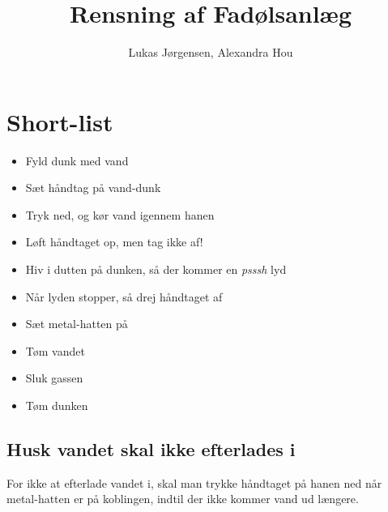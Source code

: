 

\title{Rensning af Fadølsanlæg}
\date{}
\author{Lukas Jørgensen, Alexandra Hou}



\maketitle

\section{Short-list}

\begin{itemize}
  \item Fyld dunk med vand
  \item Sæt håndtag på vand-dunk
  \item Tryk ned, og kør vand igennem hanen
  \item Løft håndtaget op, men tag ikke af!
  \item Hiv i dutten på dunken, så der kommer en \textit{psssh} lyd
  \item Når lyden stopper, så drej håndtaget af
  \item Sæt metal-hatten på
  \item Tøm vandet
  \item Sluk gassen
  \item Tøm dunken
\end{itemize}

\subsection{Husk vandet skal ikke efterlades i}
For ikke at efterlade vandet i, skal man trykke håndtaget på
hanen ned når metal-hatten er på koblingen, indtil der ikke kommer
vand ud længere.

